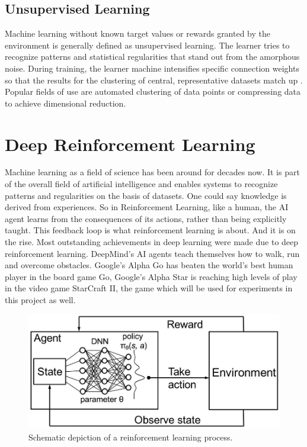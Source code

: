 \documentclass[12pt,a4paper]{article}
\begin{document}
\subsection{Unsupervised Learning}
Machine learning without known target values or rewards granted by the environment is generally defined as unsupervised learning. The learner tries to recognize patterns and statistical regularities that stand out from the amorphous noise. During training, the learner machine intensifies specific connection weights so that the results for the clustering of central, representative datasets match up \cite{Patterson1997}. Popular fields of use are automated clustering of data points or compressing data to achieve dimensional reduction.
\section{Deep Reinforcement Learning}
Machine learning as a field of science has been around for decades now. It is part of the overall field of artificial intelligence and enables systems to recognize patterns and regularities on the basis of datasets.
One could say knowledge is derived from experiences. So in Reinforcement Learning, like a human, the AI agent learns from the consequences of its actions, rather than being explicitly taught. This feedback loop is what reinforcement learning is about.
And it is on the rise. Most outstanding achievements in deep learning were made due to deep reinforcement learning. DeepMind's AI agents teach themselves how to walk, run and overcome obstacles.
Google's Alpha Go has beaten the world's best human player in the board game Go, Google's Alpha Star is reaching high levels of play in the
video game StarCraft II, the game which will be used for experiments in this project as well.
\newline
\begin{figure}
    \centering
    \includegraphics[width={0.5\linewidth}]{Figures/DRL_schemantic_depiction.jpeg}
    \caption{Schematic depiction of a reinforcement learning process.}
    \label{fig:drl_schemantic}
\end{figure}
\end{document}
